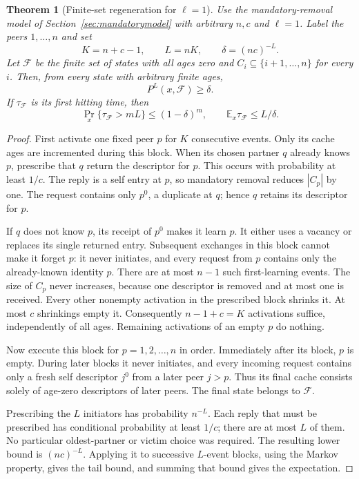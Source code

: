 \documentclass[11pt]{article}
\newtheorem{theorem}{Theorem}
\begin{document}
\begin{theorem}[Finite-set regeneration for $\ell=1$]
\label{thm:agereset}
Use the mandatory-removal model of Section~\ref{sec:mandatorymodel}
with arbitrary $n,c$ and $\ell=1$. Label the peers $1,\ldots,n$ and set
\[
 K=n+c-1,\qquad L=nK,\qquad \delta=(nc)^{-L}.
\]
Let $\mathcal F$ be the finite set of states with all ages zero and
$C_i\subseteq\{i+1,\ldots,n\}$ for every $i$. Then, from every state
with arbitrary finite ages,
\[
 P^L(x,\mathcal F)\ge\delta.
\]
If $\tau_{\mathcal F}$ is its first hitting time, then
\[
 \Pr_x\{\tau_{\mathcal F}>mL\}\le(1-\delta)^m,\qquad
 \mathbb E_x\tau_{\mathcal F}\le L/\delta .
\]
\end{theorem}
\begin{proof}
First activate one fixed peer $p$ for $K$ consecutive events.
Only its cache ages are incremented during this block. When its
chosen partner $q$ already knows $p$, prescribe that $q$ return the
descriptor for $p$. This occurs with probability at least $1/c$.
The reply is a self entry at $p$, so mandatory removal reduces
$|C_p|$ by one. The request contains only $p^0$, a duplicate at
$q$; hence $q$ retains its descriptor for $p$.

If $q$ does not know $p$, its receipt of $p^0$ makes it learn $p$.
It either uses a vacancy or replaces its single returned entry.
Subsequent exchanges in this block cannot make it forget $p$:
it never initiates, and every request from $p$ contains only the
already-known identity $p$. There are at most $n-1$ such first-learning
events. The size of $C_p$ never increases, because one descriptor is
removed and at most one is received. Every other nonempty activation
in the prescribed block shrinks it. At most $c$ shrinkings empty it.
Consequently $n-1+c=K$ activations suffice, independently of all ages.
Remaining activations of an empty $p$ do nothing.

Now execute this block for $p=1,2,\ldots,n$ in order. Immediately
after its block, $p$ is empty. During later blocks it never initiates,
and every incoming request contains only a fresh self descriptor
$j^0$ from a later peer $j>p$. Thus its final cache consists solely
of age-zero descriptors of later peers. The final state belongs
to $\mathcal F$.

Prescribing the $L$ initiators has probability $n^{-L}$. Each reply
that must be prescribed has conditional probability at least $1/c$;
there are at most $L$ of them. No particular oldest-partner or
victim choice was required. The resulting lower bound is
$(nc)^{-L}$. Applying it to successive $L$-event blocks, using the
Markov property, gives the tail bound, and summing that bound gives
the expectation.
\end{proof}
\end{document}
